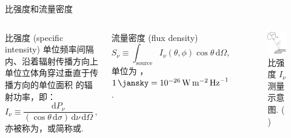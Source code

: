\documentclass{beamer}
\newcommand{\R}[1]{\text{#1}}  %
\newcommand{\D}[1]{\R{d}#1}
\newcommand{\citeay}[1]{\citeauthor{#1} \citeyear{#1} \parencite{#1}}
\let\emph\relax  %
\begin{document}
\begin{frame}{比强度和流量密度}
  \begin{columns}
      \begin{alertblock}{比强度 (specific intensity)}
        \smallskip
        单位频率间隔内、沿着辐射传播方向上单位立体角穿过垂直于传播方向的单位面积
        的辐射功率，即：
        \begin{equation}
          I_{\nu} \equiv
            \frac{\D{P_{\nu}}}{(\cos\theta\,\D{\sigma})
              \,\D{\nu} \,\D{\Omega}} \,,
        \end{equation}
        亦被称为\emph{谱亮度}，或简称\emph{强度}或\emph{亮度}.
      \end{alertblock}

      \begin{alertblock}{流量密度 (flux density)}
        \smallskip
        \begin{equation}
          S_{\nu} \equiv
            \int_{\R{source}} I_{\nu}(\theta,\phi) \cos\theta \,\D{\Omega} ,
        \end{equation}
        单位为 \si{\jansky}，
        $\SI{1}{\jansky} = \SI{e-26}{\watt\per\square\meter\per\hertz}$.
      \end{alertblock}

      \begin{figure}
        \centering
        \includegraphics[width=0.9\columnwidth]{specific-intensity}
        \caption{比强度 $I_{\nu}$ 测量示意图. (\citeay{condon2016})}
      \end{figure}
  \end{columns}
\end{frame}
\end{document}
